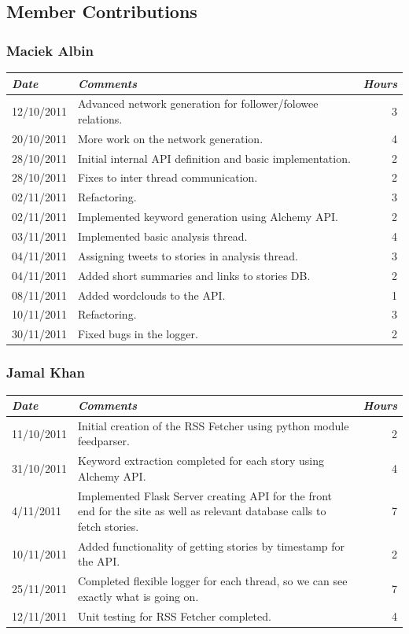 \documentclass[a4paper,12pt]{article}
\begin{document}
	\subsection{Member Contributions}
	  \subsubsection{Maciek Albin}
	    \begin{tabular}{l | p{10cm} r}
	     \emph{\large Date} & \emph{\large Comments} & \emph{\large Hours}\\
	     \hline
	     12/10/2011 & Advanced network generation for follower/folowee relations. & 3\\
	     20/10/2011 & More work on the network generation. & 4\\
	     28/10/2011 & Initial internal API definition and basic implementation. & 2\\
	     28/10/2011 & Fixes to inter thread communication. & 2\\
	     02/11/2011 & Refactoring. & 3\\
	     02/11/2011 & Implemented keyword generation using Alchemy API. & 2\\
	     03/11/2011 & Implemented basic analysis thread. & 4\\
	     04/11/2011 & Assigning tweets to stories in analysis thread. & 3\\
	     04/11/2011 & Added short summaries and links to stories DB. & 2\\
	     08/11/2011 & Added wordclouds to the API. & 1\\
	     10/11/2011 & Refactoring. & 3\\
	     30/11/2011 & Fixed bugs in the logger. & 2
	    \end{tabular}
	    
	  \subsubsection{Jamal Khan}
	  \begin{tabular}{l | p{10cm} r}
     \emph{\large Date} & \emph{\large Comments} & \emph{\large Hours}\\
     \hline
	  11/10/2011 & Initial creation of the RSS Fetcher using python module feedparser. & 2\\
    31/10/2011 & Keyword extraction completed for each story using Alchemy API. & 4\\
    4/11/2011 & Implemented Flask Server creating API for the front end for the site as well as relevant database calls to fetch stories. & 7\\
    10/11/2011 & Added functionality of getting stories by timestamp for the API. & 2\\
    25/11/2011 & Completed flexible logger for each thread, so we can see exactly what is going on. & 7\\
    12/11/2011 & Unit testing for RSS Fetcher completed. & 4
  \end{tabular}
  
\end{document}
